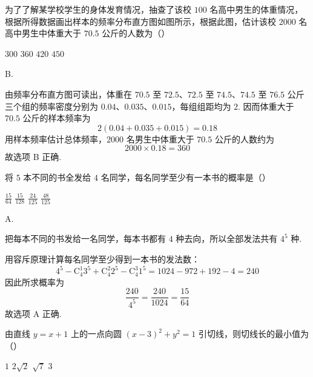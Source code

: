 \begin{problem}
为了了解某学校学生的身体发育情况，抽查了该校 \(100\) 名高中男生的体重情况，根据所得数据画出样本的频率分布直方图如图所示，根据此图，估计该校 \(2000\) 名高中男生中体重大于 \(70.5\) 公斤的人数为（\quad）


\choices
    {\(300\)}
    {\(360\)}
    {\(420\)}
    {\(450\)}
\end{problem}

\begin{answer}
B.
\end{answer}

\begin{solution}
由频率分布直方图可读出，体重在 \(70.5\) 至 \(72.5\)、\(72.5\) 至 \(74.5\)、\(74.5\) 至 \(76.5\) 公斤三个组的频率密度分别为 \(0.04\)、\(0.035\)、\(0.015\)，每组组距均为 \(2\). 因而体重大于 \(70.5\) 公斤的样本频率为
\[
2(0.04+0.035+0.015)=0.18
\]
用样本频率估计总体频率，\(2000\) 名男生中体重大于 \(70.5\) 公斤的人数约为
\[
2000\times0.18=360
\]
故选项 B 正确.
\end{solution}

\begin{problem}
将 \(5\) 本不同的书全发给 \(4\) 名同学，每名同学至少有一本书的概率是（\quad）

\choices
    {\( \frac{15}{64} \)}
    {\( \frac{15}{128} \)}
    {\( \frac{24}{125} \)}
    {\( \frac{48}{125} \)}
\end{problem}

\begin{answer}
A.
\end{answer}

\begin{solution}
把每本不同的书发给一名同学，每本书都有 \(4\) 种去向，所以全部发法共有 \(4^5\) 种.

用容斥原理计算每名同学至少得到一本书的发法数：
\[
4^5-\mathrm C_4^1 3^5+\mathrm C_4^2 2^5-\mathrm C_4^3 1^5
=1024-972+192-4=240
\]
因此所求概率为
\[
\frac{240}{4^5}=\frac{240}{1024}=\frac{15}{64}
\]
故选项 A 正确.
\end{solution}

\begin{problem}
由直线 \( y = x + 1 \) 上的一点向圆 \( (x - 3)^2 + y^2 = 1 \) 引切线，则切线长的最小值为（\quad）

\choices
    {\(1\)}
    {\(2 \sqrt{2}\)}
    {\(\sqrt{7}\)}
    {\(3\)}
\end{problem}

